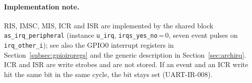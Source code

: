 \paragraph{Implementation note.}
RIS, IMSC, MIS, ICR and ISR are implemented by the shared block
\texttt{as\_irq\_peripheral} (instance \texttt{u\_irq}, \texttt{irqs\_yes\_no}\,=\,0,
seven event pulses on \texttt{irq\_other\_i}); see also the GPIO0 interrupt
registers in Section~\ref{subsec:gpioirqregs} and the generic description in
Section~\ref{sec:archirq}. ICR and ISR are write strobes and
are not stored. If an event and an ICR write hit the same bit in the same cycle,
the bit stays set (UART-IR-008).

